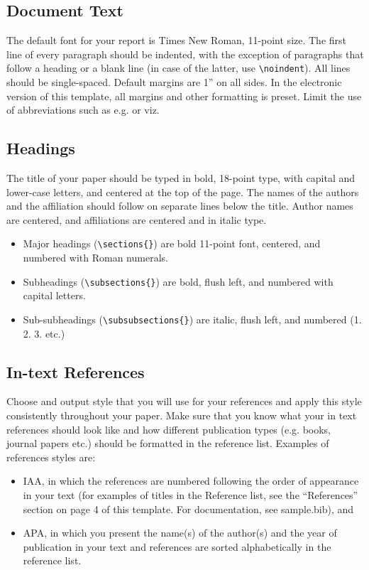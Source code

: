 \subsection{Document Text}
The default font for your report is Times New Roman, 11-point size. The first line of every paragraph should be indented, with the exception of paragraphs that follow a heading or a blank line (in case of the latter, use \verb+\noindent+). All lines should be single-spaced. Default margins are 1” on all sides. In the electronic version of this template, all margins and other formatting is preset. Limit the use of abbreviations such as e.g. or viz.

\subsection{Headings}
The title of your paper should be typed in bold, 18-point type, with capital and lower-case letters, and centered at the top of the page. The names of the authors and the affiliation should follow on separate lines below the title. Author names are centered, and affiliations are centered and in italic type.

\begin{itemize}
    \item Major headings (\verb+\sections{}+) are bold 11-point font, centered, and numbered with Roman numerals.
    \item Subheadings (\verb+\subsections{}+) are bold, flush left, and numbered with capital letters.
    \item Sub-subheadings (\verb+\subsubsections{}+) are italic, flush left, and numbered (1. 2. 3. etc.)
\end{itemize}

\subsection{In-text References}
Choose and output style that you will use for your references and apply this style consistently throughout your paper. Make sure that you know what your in text references should look like and how different publication types (e.g. books, journal papers etc.) should  be formatted in the reference list.  Examples of references styles are: 

\begin{itemize}
    \item IAA, in which the references are numbered following the order of appearance in your text (for examples of titles in the Reference list, see the “References” section on page 4 of this template. For documentation, see sample.bib), and
    \item APA, in which you present the name(s) of the author(s) and the year of publication in your text and references are sorted alphabetically in the reference list.  	
\end{itemize}

